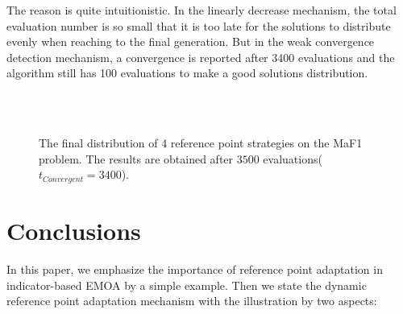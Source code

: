 \documentclass[conference]{IEEEtran}
\begin{document}
The reason is quite intuitionistic.
In the linearly decrease mechanism, the total evaluation number is so small that it is too late for the solutions 
to distribute evenly when reaching to the final generation. 
But in the weak convergence detection mechanism, a convergence is reported after 3400 evaluations and 
the algorithm still has 100 evaluations to make a good solutions distribution. 
\begin{figure}[!t]
  \centering
  \quad
  \\
  \quad
  \\
  \caption{
    The final distribution of 4 reference point strategies on the MaF1 problem.
    The results are obtained after $3500$ evaluations($t_{Convergent} = 3400$).
  }
  \label{ctdm}
\end{figure} 

\section{Conclusions}
In this paper, we emphasize the importance of reference point adaptation 
in indicator-based EMOA by a simple example. 
Then we state the dynamic reference point adaptation mechanism with the illustration by two aspects:
\end{document}
